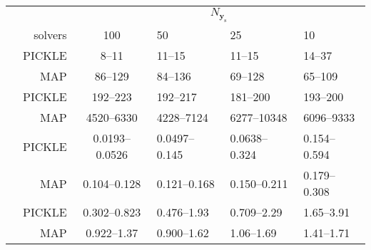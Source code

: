 \documentclass{agujournal2019}
\renewcommand{\caption}[2][]{\ignorespaces}
\begin{document}
\begin{table}[!htbp]
    \vspace{1em}%
    \begin{subtable}{\textwidth}
        \caption{Known Neumann boundary conditions}
        \label{tab:RF2_4x_known_flux_results}
        \begin{tabu} to 
            \toprule
            & &  \\
            & solvers & 100 & 50 & 25 & 10\\
            \midrule
             & PICKLE & 8--11 & 11--15 & 11--15 & 14--37 \\
            & MAP & 86--129 & 84--136 & 69--128 & 65--109 \\
            \midrule
             & PICKLE & 192--223 & 192--217 & 181--200 & 193--200 \\
            & MAP & 4520--6330 & 4228--7124 & 6277--10348 & 6096--9333 \\
            \midrule
             & PICKLE & 0.0193--0.0526 & 0.0497--0.145 & 0.0638--0.324 & 0.154--0.594 \\
            & MAP & 0.104--0.128 & 0.121--0.168 & 0.150--0.211 & 0.179--0.308 \\
            \midrule
             & PICKLE & 0.302--0.823 & 0.476--1.93 & 0.709--2.29 & 1.65--3.91 \\
            & MAP & 0.922--1.37 & 0.900--1.62 & 1.06--1.69 & 1.41--1.71 \\
            \bottomrule
        \end{tabu}
    \end{subtable}
\end{table}
\end{document}
